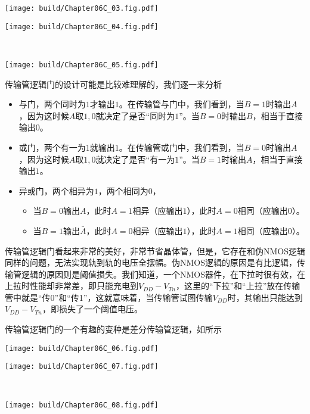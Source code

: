\begin{Figure}[传输管逻辑门]
    \begin{FigureSub}[传输管与门]
        \texttt{[image: build/Chapter06C\_03.fig.pdf]}
    \end{FigureSub}
    \hspace{1cm}
    \begin{FigureSub}[传输管或门]
        \texttt{[image: build/Chapter06C\_04.fig.pdf]}
    \end{FigureSub}\\ \vspace{0.5cm}
    \begin{FigureSub}[传输管异或门]
        \texttt{[image: build/Chapter06C\_05.fig.pdf]}
    \end{FigureSub}
\end{Figure}
传输管逻辑门的设计可能是比较难理解的，我们逐一来分析
\begin{itemize}
    \item 与门，两个同时为$1$才输出$1$。在传输管与门中，我们看到，当$B=1$时输出$A$，因为这时候$A$取$1,0$就决定了是否“同时为$1$”。当$B=0$时输出$B$，相当于直接输出$0$。
    \item 或门，两个有一为$1$就输出$1$。在传输管或门中，我们看到，当$B=0$时输出$A$，因为这时候$A$取$1,0$就决定了是否“有一为$1$”。当$B=1$时输出$A$，相当于直接输出$1$。
    \item 异或门，两个相异为$1$，两个相同为$0$，
    \begin{itemize}
        \item 当$B=0$输出$A$，此时$A=1$相异（应输出$1$），此时$A=0$相同（应输出$0$）。
        \item 当$B=1$输出$\bar{A}$，此时$A=0$相异（应输出$1$），此时$A=1$相同（应输出$0$）。
    \end{itemize}
\end{itemize}
传输管逻辑门看起来非常的美好，非常节省晶体管，但是，它存在和伪NMOS逻辑同样的问题，无法实现轨到轨的电压全摆幅。伪NMOS逻辑的原因是有比逻辑，传输管逻辑的原因则是阈值损失。我们知道，一个NMOS器件，在下拉时很有效，在上拉时性能却非常差，即只能充电到$V_{DD}-V_{Tn}$，这里的“下拉”和“上拉”放在传输管中就是“传0”和“传1”，这就意味着，当传输管试图传输$V_{DD}$时，其输出只能达到$V_{DD}-V_{Tn}$，即损失了一个阈值电压。\goodbreak

传输管逻辑门的一个有趣的变种是差分传输管逻辑，如所示
\begin{Figure}[差分传输管逻辑门]
    \begin{FigureSub}[差分传输管与门]
        \texttt{[image: build/Chapter06C\_06.fig.pdf]}
    \end{FigureSub}
    \hspace{1cm}
    \begin{FigureSub}[差分传输管或门]
        \texttt{[image: build/Chapter06C\_07.fig.pdf]}
    \end{FigureSub}\\ \vspace{0.5cm}
    \begin{FigureSub}[差分传输管异或门]
        \texttt{[image: build/Chapter06C\_08.fig.pdf]}
    \end{FigureSub}
\end{Figure}

